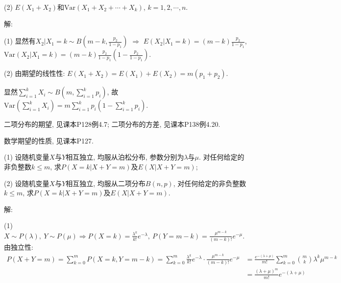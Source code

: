 \documentclass[standard]{ExBook}
\renewenvironment{shaded}{%
  \def\FrameCommand{\fboxsep=\FrameSep \colorbox{shadecolor}}%
  \MakeFramed{\advance\hsize-\width \FrameRestore}%
}{%
  \endMakeFramed
}
\begin{document}
\begin{qitems}
\begin{bbox}
\begin{shaded}
(2) $E(X_1+X_2)$和$\mathrm{Var}(X_1+X_2+\cdots+X_k)$, $k=1,2,\cdots,n$.
    \end{shaded}
    \end{bbox}

\vspace{\dimexpr2.5cm-5em\relax}

解: 

(1) 显然有$X_{2}|X_{1}=k\sim B(m-k,\displaystyle\frac{p_2}{1-p_1})$ $\Longrightarrow$ $E(X_2|X_1=k)=(m-k)\displaystyle\frac{p_2}{1-p_1}$, $\mathrm{Var}(X_2|X_1=k)=(m-k)\displaystyle\frac{p_2}{1-p_1}\left(1-\frac{p_2}{1-p_1}\right)$.

(2) 由期望的线性性: $E(X_1+X_2)=E(X_1)+E(X_2)=m(p_1+p_2)$.

显然$\displaystyle\sum\limits_{i=1}^{k}X_i\sim B(m,\sum\limits_{i=1}^{k}p_i)$, 故$\displaystyle\mathrm{Var}(\sum\limits_{i=1}^{k}X_i)=m\sum\limits_{i=1}^{k}p_i\left(1-\sum\limits_{i=1}^{k}p_i\right)$.

\textcolor{themeColor}{\selectfont {} 二项分布的期望, 见课本P128例4.7; 二项分布的方差, 见课本P138例4.20.}

\textcolor{themeColor}{\selectfont {} 数学期望的性质, 见课本P127.}

\vspace{2.5cm-5em}

    \begin{bbox}
    \begin{shaded}
        \qitem
(1) 设随机变量$ X $与$ Y $相互独立, 均服从泊松分布, 参数分别为$\lambda$与$\mu$. 对任何给定的非负整数$k\leq m$, 求$P(X = k|X + Y = m)$及$E(X|X+Y=m)$;

(2) 设随机变量$ X $与$ Y $相互独立, 均服从二项分布$B(n,p)$, 对任何给定的非负整数$k\leq m$, 求$P(X = k|X + Y = m)$及$E(X |X + Y = m)$.
    \end{shaded}
    \end{bbox}

\vspace{\dimexpr2.5cm-5em\relax}

解: 

(1) $\displaystyle X\sim P(\lambda),\ Y\sim P(\mu) \Longrightarrow P(X=k)=\frac{\lambda^k}{k!}e^{-\lambda},\ P(Y=m-k)=\frac{\mu^{m-k}}{(m-k)!}e^{-\mu}$. 由独立性:
$$
    \begin{array}{ll}
\displaystyle P(X+Y=m)=\sum\limits_{k=0}^{m}P(X=k,Y=m-k)=\sum\limits_{k=0}^{m}\frac{\lambda^k}{k!}e^{-\lambda}\cdot\frac{\mu^{m-k}}{(m-k)!}e^{-\mu} & =\displaystyle\frac{e^{-(\lambda+\mu)}}{m!}\sum\limits_{k=0}^{m}\binom{m}{k}\lambda^k \mu^{m-k}\\
& =\displaystyle\frac{(\lambda+\mu)^m}{m!}e^{-(\lambda+\mu)}
    \end{array}
$$


\end{qitems}
\end{document}
